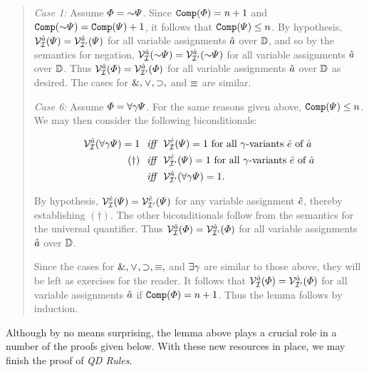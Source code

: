 \begin{quote}
  \textit{Case 1:} Assume $\metaA=\enot\metaB$.
  Since $\texttt{Comp}(\varPhi)=n+1$ and $\comp(\enot\metaB)=\comp(\metaB)+1$, it follows that $\texttt{Comp}(\varPsi)\leq n$.
  By hypothesis, $\mathcal{V}_{\mathcal{I}}^{\hat{a}}(\varPsi)=\mathcal{V}_{\mathcal{I}'}^{\hat{a}}(\varPsi)$ for all variable assignments $\hat{a}$ over $\mathbb{D}$, and so by the semantics for negation, $\VV{\I}{\va{a}}(\enot\metaB)=\VV{\I'}{\va{a}}(\enot\metaB)$ for all variable assignments $\hat{a}$ over $\mathbb{D}$.
  Thus $\mathcal{V}_{\mathcal{I}}^{\hat{a}}(\varPhi)=\mathcal{V}_{\mathcal{I}'}^{\hat{a}}(\varPhi)$ for all variable assignments $\hat{a}$ over $\mathbb{D}$ as desired. 
  The cases for $\mathrel\&,\mkern1mu\vee\mkern1mu,\supset,$ and $\equiv$ are similar.

  \textit{Case 6:} Assume $\varPhi=\forall \gamma\varPsi$.
  For the same reasons given above, $\texttt{Comp}(\varPsi)\leq n$.
  We may then consider the following biconditionals:

  \vspace{-.2in}
  \begin{align*}
    \mathcal{V}_{\mathcal{I}}^{\hat{a}}(\forall \gamma\varPsi)=1 &\textit{ ~iff~ } \mathcal{V}_{\mathcal{I}}^{\hat{e}}(\varPsi)=1 \text{ for all } \gamma\text{-variants } \hat{e} \text{ of } \hat{a}\\ 
      (\dagger) &\textit{ ~iff~ } \mathcal{V}_{\mathcal{I}'}^{\hat{e}}(\varPsi)=1 \text{ for all } \gamma\text{-variants } \hat{e} \text{ of } \hat{a}\\  
      &\textit{ ~iff~ } \mathcal{V}_{\mathcal{I}'}^{\hat{a}}(\forall \gamma\varPsi)=1.
  \end{align*}

  By hypothesis, $\mathcal{V}_{\mathcal{I}}^{\hat{e}}(\varPsi)=\mathcal{V}_{\mathcal{I}'}^{\hat{e}}(\varPsi)$ for any variable assignment $\hat{e}$, thereby establishing $(\dagger)$.
  The other biconditionals follow from the semantics for the universal quantifier.
  Thus $\mathcal{V}_{\mathcal{I}}^{\hat{a}}(\varPhi)=\mathcal{V}_{\mathcal{I}'}^{\hat{a}}(\varPhi)$ for all variable assignments $\hat{a}$ over $\mathbb{D}$. 

  Since the cases for $\mathrel\&,\mkern1mu\vee\mkern1mu,\supset,\equiv,$ and $\exists \gamma$ are similar to those above, they will be left as exercises for the reader.
  It follows that $\mathcal{V}_{\mathcal{I}}^{\hat{a}}(\varPhi)=\mathcal{V}_{\mathcal{I}'}^{\hat{a}}(\varPhi)$ for all variable assignments $\hat{a}$ if $\texttt{Comp}(\varPhi)=n+1$.
  Thus the lemma follows by induction.
\end{quote}

Although by no means surprising, the lemma above plays a crucial role in a number of the proofs given below.
With these new resources in place, we may finish the proof of \textit{QD Rules}.





